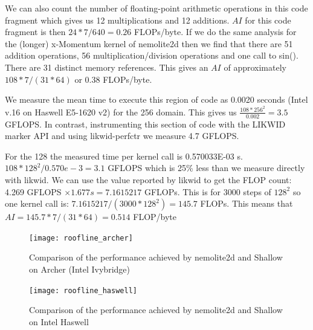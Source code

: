 \documentclass[12pt]{article}
\begin{document}
We can also count the number of floating-point arithmetic operations
in this code fragment which gives us 12 multiplications and 12
additions. $AI$ for this code fragment is then $24*7/640 = 0.26$
FLOPs/byte.  If we do the same analysis for the (longer) x-Momentum
kernel of nemolite2d then we find that there are 51 addition
operations, 56 multiplication/division operations and one call to
sin(). There are 31 distinct memory references. This gives an $AI$ of
approximately $108*7/(31*64)$ or 0.38 FLOPs/byte.

We measure the mean time to execute this region of code as 0.0020
seconds (Intel v.16 on Haswell E5-1620 v2) for the 256 domain. This
gives us $\frac{108*256^2}{0.002} = 3.5$ GFLOPS. In contrast,
instrumenting this section of code with the LIKWID marker API and
using likwid-perfctr we measure 4.7 GFLOPS.

For the 128 the measured time per kernel call is 0.570033E-03 s.
$108*128^2/0.570e-3 = 3.1$ GFLOPS which is 25\% less than we measure
directly with likwid.  We can use the value reported by likwid to get
the FLOP count: 4.269 GFLOPS $\times 1.677 s = 7.1615217$ GFLOPs. This is for
3000 steps of $128^2$ so one kernel call is: $7.1615217/(3000*128^2) =
145.7$ FLOPs. This means that $AI = 145.7*7/(31*64) = 0.514$ FLOP/byte

\begin{figure}
\centering
\texttt{[image: roofline\_archer]}
\caption{Comparison of the performance achieved by nemolite2d and Shallow on Archer (Intel Ivybridge)}
\label{FIG_roofline_archer}
\end{figure}

\begin{figure}
\centering
\texttt{[image: roofline\_haswell]}
\caption{Comparison of the performance achieved by nemolite2d and Shallow on Intel Haswell}
\label{FIG_roofline_haswell}
\end{figure}
\end{document}
